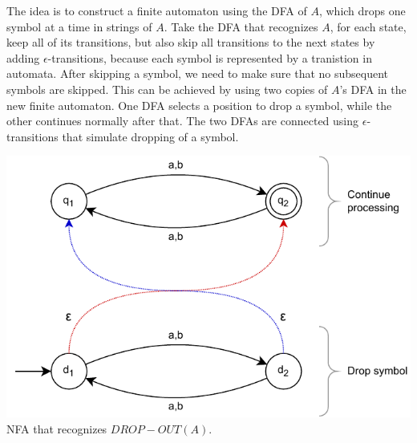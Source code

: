 \documentclass[11pt]{article}
\newenvironment{problem}[2][Problem]{\begin{trivlist}
\item[\hskip \labelsep {\bfseries #1}\hskip \labelsep {\bfseries #2.}]}{\end{trivlist}}
\begin{document}
The idea is to construct a finite automaton using the DFA of $A$, which drops one symbol at a time in strings of $A$. Take the DFA that recognizes $A$, for each state, keep all of its transitions, but also skip all transitions to the next states by adding $\epsilon$-transitions, because each symbol is represented by a tranistion in automata. After skipping a symbol, we need to make sure that no subsequent symbols are skipped. This can be achieved by using two copies of $A$'s DFA in the new finite automaton. One DFA selects a position to drop a symbol, while the other continues normally after that. The two DFAs are connected using $\epsilon$-transitions that simulate dropping of a symbol.
\begin{center}
\includegraphics[scale=1]{Figures/Problem1.43b.pdf} \\
NFA that recognizes $DROP-OUT(A)$.
\end{center}



\end{document}
